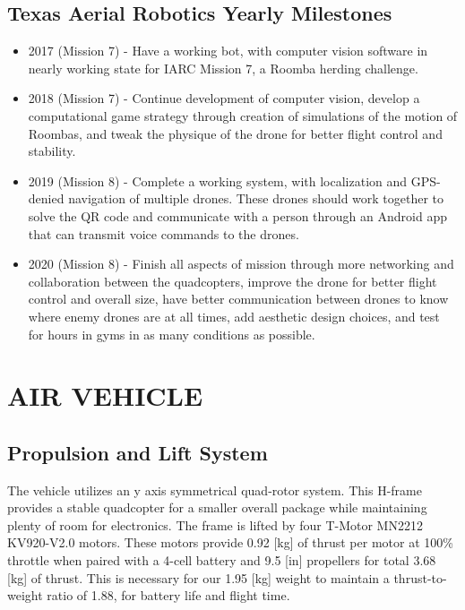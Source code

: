 \documentclass[12pt,letterpaper]{article}
\begin{document}
	\pagebreak
	\subsection*{Texas Aerial Robotics Yearly Milestones}

	\begin{itemize}

		\item 2017 (Mission 7) - Have a working bot, with computer vision software in nearly working state for IARC Mission 7, a Roomba herding challenge. 

		\item 2018 (Mission 7) - Continue development of computer vision, develop a computational game strategy through creation of simulations of the motion of Roombas, and tweak the physique of the drone for better flight control and stability. 

		\item 2019 (Mission 8) - Complete a working system, with localization and GPS-denied navigation of multiple drones. These drones should work together to solve the QR code and communicate with a person through an Android app that can transmit voice commands to the drones.

		\item 2020 (Mission 8) - Finish all aspects of mission through more networking and collaboration between the quadcopters, improve the drone for better flight control and overall size, have better communication between drones to know where enemy drones are at all times, add aesthetic design choices, and test for hours in gyms in as many conditions as possible.
	\end{itemize}

\section*{AIR VEHICLE}
	\subsection*{Propulsion and Lift System}
The vehicle utilizes an y axis symmetrical quad-rotor system. This H-frame provides a stable quadcopter for a smaller overall package while maintaining plenty of room for electronics. The frame is lifted by four T-Motor MN2212 KV920-V2.0 motors. These motors provide 0.92 [kg] of thrust per motor at 100\% throttle when paired with a 4-cell battery and 9.5 [in] propellers for total 3.68 [kg] of thrust. This is necessary for our 1.95 [kg] weight to maintain a thrust-to-weight ratio of 1.88, for battery life and flight time.
\end{document}
